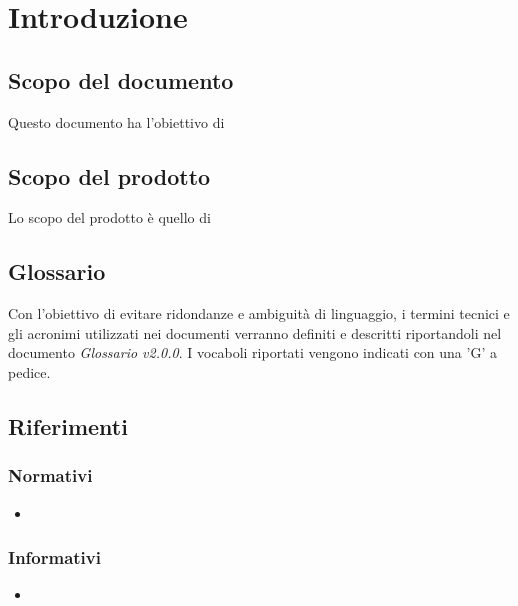 \section{Introduzione}
\subsection{Scopo del documento}
Questo documento ha l'obiettivo di

\subsection{Scopo del prodotto}
Lo scopo del prodotto è quello di 
\subsection{Glossario}
Con l'obiettivo di evitare ridondanze e ambiguità di linguaggio, i termini tecnici e gli acronimi
utilizzati nei documenti verranno definiti e descritti riportandoli nel documento \textit{Glossario v2.0.0}.
I vocaboli riportati vengono indicati con una 'G' a pedice.
\subsection{Riferimenti}
\subsubsection{Normativi}
\begin{itemize}
	\item 
\end{itemize}

\subsubsection{Informativi}
\begin{itemize}
	\item 
\end{itemize}
